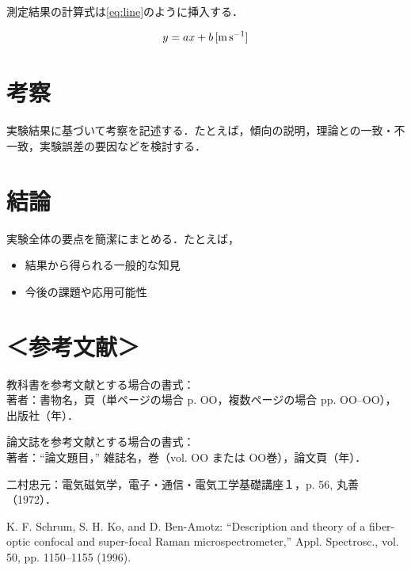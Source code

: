 \documentclass[lualatex,ja=standard]{bxjsarticle}
\begin{document}
測定結果の計算式は\autoref{eq:line}のように挿入する．

\begin{equation}
  y = a x + b \,\text{[\si{\meter\per\second}]}
  \label{eq:line}
\end{equation}

\section{考察}

実験結果に基づいて考察を記述する．たとえば，傾向の説明，理論との一致・不一致，実験誤差の要因などを検討する．

\section{結論}

実験全体の要点を簡潔にまとめる．たとえば，

\begin{itemize}
  \item 結果から得られる一般的な知見
  \item 今後の課題や応用可能性
\end{itemize}

\section*{＜参考文献＞}

\begin{enumerate}[label={[\arabic*]}]
  \item 教科書を参考文献とする場合の書式：\\
  著者：書物名，頁（単ページの場合 p. OO，複数ページの場合 pp. OO--OO），出版社（年）．

  \item 論文誌を参考文献とする場合の書式：\\
  著者：“論文題目，” 雑誌名，巻（vol. OO または OO巻），論文頁（年）．

  \item 二村忠元：電気磁気学，電子・通信・電気工学基礎講座１，p. 56, 丸善（1972）．

  \item K. F. Schrum, S. H. Ko, and D. Ben-Amotz: “Description and theory of a fiber-optic confocal and super-focal Raman microspectrometer,” Appl. Spectrosc., vol. 50, pp. 1150–1155 (1996).
\end{enumerate}
\end{document}
